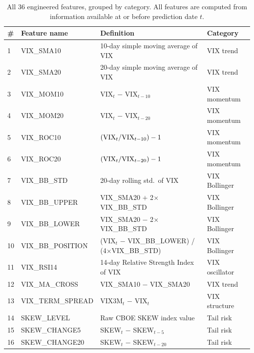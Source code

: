 \documentclass[12pt]{article}
\begin{document}
\begin{table}[H]
\centering
\caption{All 36 engineered features, grouped by category. All features are computed from
information available at or before prediction date $t$.}
\label{tab:features}
\footnotesize
\renewcommand{\arraystretch}{0.95}
\begin{tabular}{llll}
\toprule
\# & Feature name & Definition & Category \\
\midrule
1  & VIX\_SMA10        & 10-day simple moving average of VIX                        & VIX trend \\
2  & VIX\_SMA20        & 20-day simple moving average of VIX                        & VIX trend \\
3  & VIX\_MOM10        & VIX$_t$ $-$ VIX$_{t-10}$                                  & VIX momentum \\
4  & VIX\_MOM20        & VIX$_t$ $-$ VIX$_{t-20}$                                  & VIX momentum \\
5  & VIX\_ROC10        & $({\rm VIX}_t / {\rm VIX}_{t-10}) - 1$                     & VIX momentum \\
6  & VIX\_ROC20        & $({\rm VIX}_t / {\rm VIX}_{t-20}) - 1$                     & VIX momentum \\
7  & VIX\_BB\_STD      & 20-day rolling std.\ of VIX                                & VIX Bollinger \\
8  & VIX\_BB\_UPPER    & VIX\_SMA20 $+$ 2$\times$VIX\_BB\_STD                       & VIX Bollinger \\
9  & VIX\_BB\_LOWER    & VIX\_SMA20 $-$ 2$\times$VIX\_BB\_STD                       & VIX Bollinger \\
10 & VIX\_BB\_POSITION & (VIX$_t$ $-$ VIX\_BB\_LOWER) / (4$\times$VIX\_BB\_STD)    & VIX Bollinger \\
11 & VIX\_RSI14        & 14-day Relative Strength Index of VIX                      & VIX oscillator \\
12 & VIX\_MA\_CROSS      & VIX\_SMA10 $-$ VIX\_SMA20                                  & VIX trend \\
13 & VIX\_TERM\_SPREAD & VIX3M$_t$ $-$ VIX$_t$                                      & VIX structure \\
\midrule
14 & SKEW\_LEVEL       & Raw CBOE SKEW index value                                  & Tail risk \\
15 & SKEW\_CHANGE5        & SKEW$_t$ $-$ SKEW$_{t-5}$                                  & Tail risk \\
16 & SKEW\_CHANGE20       & SKEW$_t$ $-$ SKEW$_{t-20}$                                 & Tail risk \\

\end{tabular}
\end{table}
\end{document}
